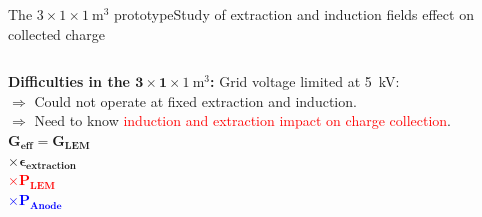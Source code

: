 \documentclass[10pt]{beamer}
\begin{document}
    \begin{frame}{The \texorpdfstring{$3 \times 1 \times \SI{1}{\meter\cubed}$}{311} prototype}{Study of extraction and induction fields effect on collected charge}
    	\begin{scriptsize}
    		\begin{columns}
    			\hspace{-1.5cm}
	    		\begin{column}{0.35\textwidth}
	    			\textbf{Difficulties in the $\mathbf{3 \times 1 \times} \SI[detect-weight]{1}{\meter\cubed}$:} Grid voltage limited at \SI{5}{\kilo\volt}:\\
	    			\vspace{0.3cm}
	    			$\Rightarrow$ Could not operate at fixed extraction and induction.\\
	    			$\Rightarrow$ Need to know \textcolor{red}{induction and extraction impact on charge collection}.\\
	    			\vspace{0.3cm}	    			
		    		$\mathbf{G_{eff} = G_{LEM}} $ \\\hspace{0.7cm} $\boldsymbol{\times \epsilon}_{\mathbf{extraction}}$ \\\hspace{0.7cm} \textcolor{red}{$\boldsymbol{\times} \mathbf{P_{LEM}}$}\\\hspace{0.7cm} \textcolor{blue}{$\boldsymbol{\times} \mathbf{P_{Anode}}$}

\end{column}
\end{columns}
\end{scriptsize}
\end{frame}
\end{document}
